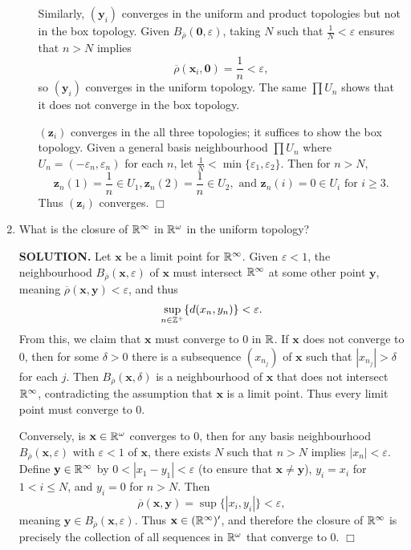 \documentclass{article}
\begin{document}
\begin{enumerate}
\begin{enumerate}
        Similarly, $(\mathbf{y}_i)$ converges in the uniform and product topologies but not in the box topology. Given $B_{\overline{\rho}}(\mathbf{0}, \varepsilon)$, taking $N$ such that $\frac1N < \varepsilon$ ensures that $n > N$ implies
        $$\overline{\rho}(\mathbf{x}_i, \mathbf{0}) = \frac1n < \varepsilon,$$
        so $(\mathbf{y}_i)$ converges in the uniform topology. The same $\prod U_n$ shows that it does not converge in the box topology.

        $(\mathbf{z}_i)$ converges in the all three topologies; it suffices to show the box topology. Given a general basis neighbourhood $\prod U_n$ where $U_n = (-\varepsilon_n, \varepsilon_n)$ for each $n$, let $\frac1N < \min \{\varepsilon_1, \varepsilon_2\}$. Then for $n > N$, 
        $$\mathbf{z}_n(1) = \frac1n \in U_1, \mathbf{z}_n(2) = \frac1n \in U_2, \text{ and } \mathbf{z}_n(i) = 0 \in U_i \text{ for } i \geq 3.$$
        Thus $(\mathbf{z}_i)$ converges. $\Box$
    \end{enumerate}

    \item What is the closure of $\mathbb{R}^\infty$ in $\mathbb{R}^\omega$ in the uniform topology?

    {\bf SOLUTION.} Let $\mathbf{x}$ be a limit point for $\mathbb{R}^\infty$. Given $\varepsilon < 1$, the neighbourhood $B_{\overline{\rho}}(\mathbf{x}, \varepsilon)$ of $\mathbf{x}$ must intersect $\mathbb{R}^\infty$ at some other point $\mathbf{y}$, meaning $\overline{\rho}(\mathbf{x}, \mathbf{y}) < \varepsilon$, and thus
    $$\sup_{n \in \mathbb{Z}^+} \{d(x_n, y_n)\} < \varepsilon.$$
    From this, we claim that $\mathbf{x}$ must converge to $0$ in $\mathbb{R}$. If $\mathbf{x}$ does not converge to $0$, then for some $\delta > 0$ there is a subsequence $(x_{n_j})$ of $\mathbf{x}$ such that $|x_{n_j}| > \delta$ for each $j$. Then $B_{\overline{\rho}}(\mathbf{x}, \delta)$ is a neighbourhood of $\mathbf{x}$ that does not intersect $\mathbb{R}^\infty$, contradicting the assumption that $\mathbf{x}$ is a limit point. Thus every limit point must converge to $0$.

    Conversely, is $\mathbf{x} \in \mathbb{R}^\omega$ converges to $0$, then for any basis neighbourhood $B_{\overline{\rho}}(\mathbf{x}, \varepsilon)$ with $\varepsilon < 1$ of $\mathbf{x}$, there exists $N$ such that $n > N$ implies $|x_n| < \varepsilon$. Define $\mathbf{y} \in \mathbb{R}^\infty$ by $0 < |x_1-y_1| < \varepsilon$ (to ensure that $\mathbf{x} \neq \mathbf{y}$), $y_i = x_i$ for $1 < i \leq N$, and $y_i = 0$ for $n > N$. Then
    $$\overline{\rho}(\mathbf{x}, \mathbf{y}) = \sup \{|x_i, y_i|\} < \varepsilon,$$
    meaning $\mathbf{y} \in B_{\overline{\rho}}(\mathbf{x}, \varepsilon)$. Thus $\mathbf{x} \in (\mathbb{R}^\infty)'$, and therefore the closure of $\mathbb{R}^\infty$ is precisely the collection of all sequences in $\mathbb{R}^\omega$ that converge to $0$. $\Box$


\end{enumerate}
\end{document}
